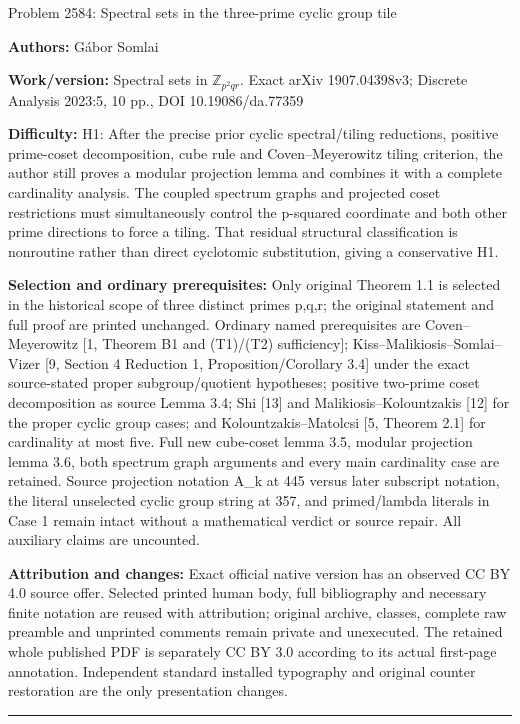 \documentclass[10pt]{article}
\begin{document}
\begin{center}\Large Problem 2584: Spectral sets in the three-prime cyclic group tile\end{center}
\noindent\textbf{Authors:} G\'abor Somlai\par
\noindent\textbf{Work/version:} Spectral sets in $\mathbb{Z}_{p^2qr}$. Exact arXiv 1907.04398v3; Discrete Analysis 2023:5, 10 pp., DOI 10.19086/da.77359\par
\noindent\textbf{Difficulty:} H1: After the precise prior cyclic spectral/tiling reductions, positive prime-coset decomposition, cube rule and Coven--Meyerowitz tiling criterion, the author still proves a modular projection lemma and combines it with a complete cardinality analysis. The coupled spectrum graphs and projected coset restrictions must simultaneously control the p-squared coordinate and both other prime directions to force a tiling. That residual structural classification is nonroutine rather than direct cyclotomic substitution, giving a conservative H1.\par
\noindent\textbf{Selection and ordinary prerequisites:} Only original Theorem 1.1 is selected in the historical scope of three distinct primes p,q,r; the original statement and full proof are printed unchanged. Ordinary named prerequisites are Coven--Meyerowitz [1, Theorem B1 and (T1)/(T2) sufficiency]; Kiss--Malikiosis--Somlai--Vizer [9, Section 4 Reduction 1, Proposition/Corollary 3.4] under the exact source-stated proper subgroup/quotient hypotheses; positive two-prime coset decomposition as source Lemma 3.4; Shi [13] and Malikiosis--Kolountzakis [12] for the proper cyclic group cases; and Kolountzakis--Matolcsi [5, Theorem 2.1] for cardinality at most five. Full new cube-coset lemma 3.5, modular projection lemma 3.6, both spectrum graph arguments and every main cardinality case are retained. Source projection notation A\_k at 445 versus later subscript notation, the literal unselected cyclic group string at 357, and primed/lambda literals in Case 1 remain intact without a mathematical verdict or source repair. All auxiliary claims are uncounted.\par
\noindent\textbf{Attribution and changes:} Exact official native version has an observed CC BY 4.0 source offer. Selected printed human body, full bibliography and necessary finite notation are reused with attribution; original archive, classes, complete raw preamble and unprinted comments remain private and unexecuted. The retained whole published PDF is separately CC BY 3.0 according to its actual first-page annotation. Independent standard installed typography and original counter restoration are the only presentation changes.\par
\medskip\hrule\medskip
\end{document}
